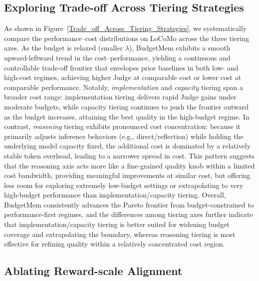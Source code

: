 \subsection{Exploring Trade-off Across Tiering Strategies}
\label{sec:trade-off}




As shown in Figure~\ref{Trade_off_Across_Tiering_Strategies}, we systematically compare the performance–cost distributions on LoCoMo across the three tiering axes. As the budget is relaxed (smaller $\lambda$), BudgetMem exhibits a smooth upward-leftward trend in the cost–performance, yielding a continuous and controllable trade-off frontier that envelopes prior baselines in both low- and high-cost regimes, achieving higher Judge at comparable cost or lower cost at comparable performance. Notably, \emph{implementation} and \emph{capacity} tiering span a broader cost range: implementation tiering delivers rapid Judge gains under moderate budgets, while capacity tiering continues to push the frontier outward as the budget increases, attaining the best quality in the high-budget regime. In contrast, \emph{reasoning} tiering exhibits pronounced cost concentration: because it primarily adjusts inference behaviors (e.g., direct/reflection) while holding the underlying model capacity fixed, the additional cost is dominated by a relatively stable token overhead, leading to a narrower spread in cost. This pattern suggests that the reasoning axis acts more like a fine-grained quality knob within a limited cost bandwidth, providing meaningful improvements at similar cost, but offering less room for exploring extremely low-budget settings or extrapolating to very high-budget performance than implementation/capacity tiering. Overall, BudgetMem consistently advances the Pareto frontier from budget-constrained to performance-first regimes, and the differences among tiering axes further indicate that implementation/capacity tiering is better suited for widening budget coverage and extrapolating the boundary, whereas reasoning tiering is most effective for refining quality within a relatively concentrated cost region.





\subsection{Ablating Reward-scale Alignment}
\label{sec:ablation}





